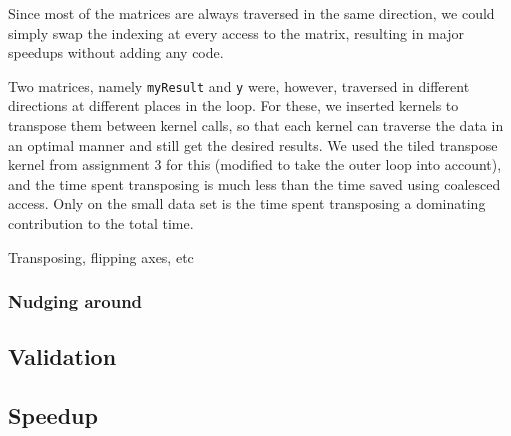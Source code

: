 \documentclass[11pt]{article}
\begin{document}
Since most of the matrices are always traversed in the same direction, we could simply swap the indexing at every access to the matrix, resulting in major speedups without adding any code.

Two matrices, namely \texttt{myResult} and \texttt{y} were, however, traversed in different directions at different places in the loop.
For these, we inserted kernels to transpose them between kernel calls, so that each kernel can traverse the data in an optimal manner and still get the desired results.
We used the tiled transpose kernel from assignment 3 for this (modified to take the outer loop into account), and the time spent transposing is much less than the time saved using coalesced access.
Only on the small data set is the time spent transposing a dominating contribution to the total time.

Transposing, flipping axes, etc

\subsubsection{Nudging around}

\subsection{Validation}

\subsection{Speedup}
\begin{table}[h]
\centering
{}
\caption{Speedup comparison of the original implementation, the OpenMP implementation and the CUDA implementation}
\label{table:cudatime}
\end{table}
\end{document}
